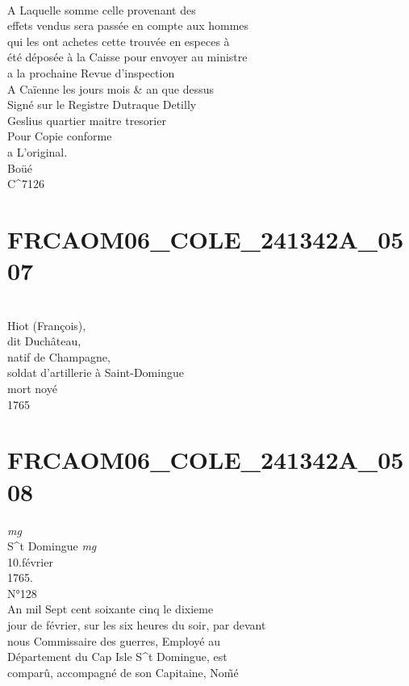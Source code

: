 \documentclass{article}
\begin{document}
\begin{pages}
\\
A Laquelle somme celle provenant des\\
effets vendus sera passée en compte aux hommes\\
qui les ont achetes cette trouvée en especes à\\
été déposée à la Caisse pour envoyer au ministre\\
a la prochaine Revue d'inspection\\
A Caïenne les jours mois \& an que dessus\\
Signé sur le Registre Dutraque Detilly\\
Geslius quartier maitre tresorier\\
Pour Copie conforme\\
a L'original.\\
Boüé\\
C\^{}7126
\pend
\endnumbering\beginnumbering\section{FRCAOM06\_COLE\_241342A\_0507}\pstart
\\
Hiot (François),\\
dit Duchâteau,\\
natif de Champagne,\\
soldat d'artillerie à Saint-Domingue\\
mort noyé\\
1765
\pend
\endnumbering\beginnumbering\section{FRCAOM06\_COLE\_241342A\_0508}
\vspace{0.5cm}\noindent
\textit{mg}
\footnotesize \\
S\^{}t Domingue
\normalsize 
\vspace{0.5cm}\noindent
\textit{mg}
\footnotesize \\
10.février\\
1765.\\
N°128
\normalsize \pstart
\\
An mil Sept cent soixante cinq le dixieme\\
jour de février, sur les six heures du soir, par devant\\
nous Commissaire des guerres, Employé au\\
Département du Cap Isle S\^{}t Domingue, est\\
comparû, accompagné de son Capitaine, Nom̃é\\

\end{pages}
\end{document}
